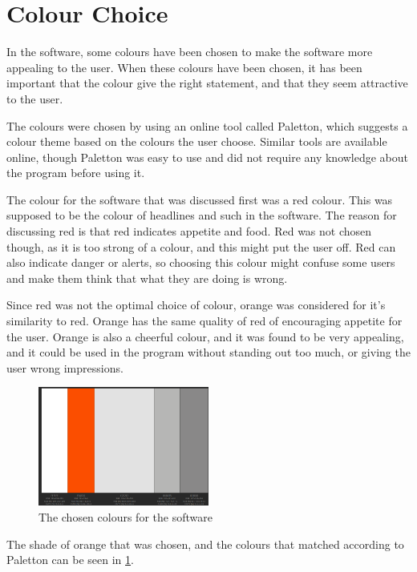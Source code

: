 \section{Colour Choice}

In the software, some colours have been chosen to make the software more appealing to the user. When these colours have been chosen, it has been important that the colour give the right statement, and that they seem attractive to the user.

The colours were chosen by using an online tool called Paletton\cite{paletton}, which suggests a colour theme based on the colours the user choose. Similar tools are available online, though Paletton was easy to use and did not require any knowledge about the program before using it.

The colour for the software that was discussed first was a red colour. This was supposed to be the colour of headlines and such in the software. The reason for discussing red is that red indicates appetite and food\cite{color_psychology}. Red was not chosen though, as it is too strong of a colour, and this might put the user off. Red can also indicate danger or alerts, so choosing this colour might confuse some users and make them think that what they are doing is wrong.

Since red was not the optimal choice of colour, orange was considered for it's similarity to red. Orange has the same quality of red of encouraging appetite for the user. Orange is also a cheerful colour, and it was found to be very appealing, and it could be used in the program without standing out too much, or giving the user wrong impressions.

\begin{figure}[H]
	\centering
    \includegraphics[width=0.5\textwidth]{Grafik/FoodPlanner/ChosenColours}
	\caption{The chosen colours for the software}
	\label{ChosenColours}
\end{figure}

The shade of orange that was chosen, and the colours that matched according to Paletton can be seen in \cref{ChosenColours}.

